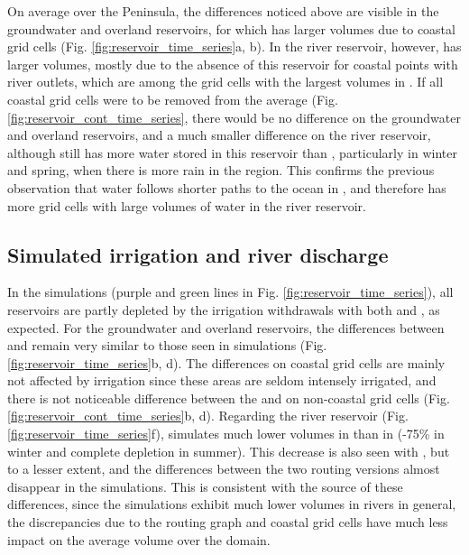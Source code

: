 On average over the Peninsula, the differences noticed above are visible in the groundwater and overland reservoirs, for which \native has larger volumes due to coastal grid cells (Fig. \ref{fig:reservoir_time_series}a, b). In the river reservoir, however, \std has larger volumes, mostly due to the absence of this reservoir for \native coastal points with river outlets, which are among the grid cells with the largest volumes in \std.
If all coastal grid cells were to be removed from the average (Fig. \ref{fig:reservoir_cont_time_series},%
there would be no difference on the groundwater and overland reservoirs, and a much smaller difference on the river reservoir, although \std still has more water stored in this reservoir than \native, particularly in winter and spring, when there is more rain in the region. This confirms the previous observation that water follows shorter paths to the ocean in \native, and \std therefore has more grid cells with large volumes of water in the river reservoir.

\subsection{Simulated irrigation and river discharge}

In the \irr simulations (purple and green lines in Fig. \ref{fig:reservoir_time_series}), all reservoirs are partly depleted by the irrigation withdrawals with both \std and \native, as expected. 
For the groundwater and overland reservoirs, the differences between \std and \native remain very similar to those seen in \noirr simulations (Fig. \ref{fig:reservoir_time_series}b, d). The differences on coastal grid cells are mainly not affected by irrigation since these areas are seldom intensely irrigated, and there is not noticeable difference between the \std and \native on non-coastal grid cells (Fig. \ref{fig:reservoir_cont_time_series}b, d). %
Regarding the river reservoir (Fig. \ref{fig:reservoir_time_series}f), \std simulates much lower volumes in \irr than in \noirr (-75\% in winter and complete depletion in summer). This decrease is also seen with \native, but to a lesser extent, and the differences between the two routing versions almost disappear in the  \irr simulations.
This is consistent with the source of these differences, since the \irr simulations exhibit much lower volumes in rivers in general, the discrepancies due to the routing graph and coastal grid cells have much less impact on the average volume over the domain.


